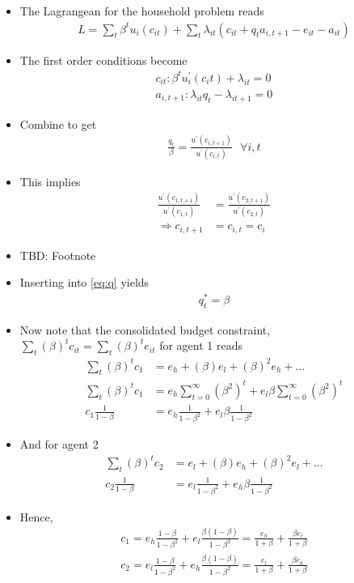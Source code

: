 \documentclass{scrartcl}
\begin{document}
\begin{itemize}
	\item The Lagrangean for the household problem reads
	\begin{align}
	L=\sum_{t} \beta^t u_{i} (c_{it})+\sum_t \lambda_{it} \left( c_{it}+q_t a_{i,t+1}-e_{it}-a_{it}\right)
	\end{align}
	\item The first order conditions become
	\begin{align}
	c_{it}: \beta^t u^\prime_i(c_it)+\lambda_{it}=0 \\
	a_{i,t+1}: \lambda_{it} q_t - \lambda_{it+1}=0
	\end{align}
	\item Combine to get
	\begin{align}
	\frac{q_t}{\beta}=\frac{u^\prime(c_{i,t+1})}{u^\prime(c_{i,t})} \text{ } \forall i,t \label{eq:q}
	\end{align}
	\item This implies 
	\begin{align}
	\frac{u^\prime(c_{1,t+1})}{u^\prime(c_{1,t})}&=	\frac{u^\prime(c_{2,t+1})}{u^\prime(c_{2,t})} \\
	\Rightarrow c_{i,t+1}&=c_{i,t}=c_i
	\end{align}
	\item TBD: Footnote
	\item Inserting into \eqref{eq:q} yields 
	\begin{align}
	q_t^*=\beta
	\end{align}
	\item Now note that the consolidated budget constraint, $\sum_t \left( \beta \right)^t c_{it}=\sum_t \left( \beta \right)^t e_{it}$ for agent 1 reads
	\begin{align}
	\sum_t \left( \beta \right)^t c_{1}&=e_h+\left( \beta \right)e_l+\left( \beta \right)^2e_h+\dots \\
	\sum_t \left( \beta \right)^t c_{1}&=e_h\sum_{t=0}^{\infty} (\beta^2)^t+e_l \beta \sum_{t=0}^{\infty} (\beta^2)^t\\
	c_{1}\frac{1}{1-\beta}&=e_h\frac{1}{1-\beta^2}+e_l\beta\frac{1}{1-\beta^2}
	\end{align}
\item And for agent 2
	\begin{align}
	\sum_t \left( \beta \right)^t c_{2}&=e_l+\left( \beta \right)e_h+\left( \beta \right)^2e_l+\dots \\
	c_{2}\frac{1}{1-\beta}&=e_l\frac{1}{1-\beta^2}+e_h\beta\frac{1}{1-\beta^2}
	\end{align}
	\item Hence,
		\begin{align}
		c_{1}=e_h\frac{1-\beta}{1-\beta^2}+e_l\frac{\beta(1-\beta)}{1-\beta^2}=\frac{e_h}{1+\beta}+\frac{\beta e_l}{1+\beta} \\
		c_{2}=e_l\frac{1-\beta}{1-\beta^2}+e_h\frac{\beta(1-\beta)}{1-\beta^2}=\frac{e_l}{1+\beta}+\frac{\beta e_h}{1+\beta} 
		\end{align}
	

\end{itemize}
\end{document}
